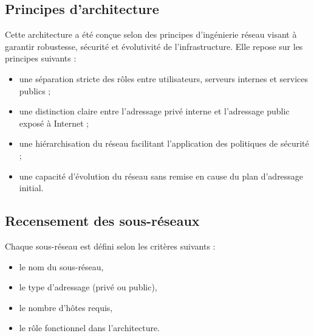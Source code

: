 \documentclass[12pt,a4paper, oneside]{memoir}
\begin{document}
\subsection{Principes d’architecture}
Cette architecture a été conçue selon des principes d’ingénierie réseau visant à garantir robustesse, sécurité et évolutivité de l’infrastructure. Elle repose sur les principes suivants :

\begin{itemize}
	\item une séparation stricte des rôles entre utilisateurs, serveurs internes et services publics ;
	\item une distinction claire entre l’adressage privé interne et l’adressage public exposé à Internet ;
	\item une hiérarchisation du réseau facilitant l’application des politiques de sécurité ;
	\item une capacité d’évolution du réseau sans remise en cause du plan d’adressage initial.
\end{itemize}

\subsection{Recensement des sous-réseaux}

Chaque sous-réseau est défini selon les critères suivants :

\begin{itemize}
	\item le nom du sous-réseau,
	\item le type d’adressage (privé ou public),
	\item le nombre d’hôtes requis,
	\item le rôle fonctionnel dans l’architecture.
\end{itemize}
\end{document}
